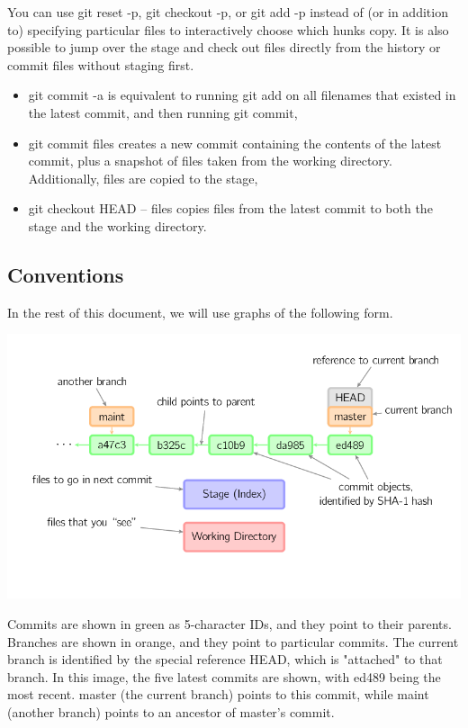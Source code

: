 \documentclass[a4paper]{article}
\begin{document}
\begin{CJK}{UTF8}{mj}
\begin{itemize}
\end{itemize}
You can use git reset -p, git checkout -p, or git add -p instead of (or in addition to) specifying particular files to interactively choose which hunks copy.
It is also possible to jump over the stage and check out files directly from the history or commit files without staging first.

\begin{itemize}
\item git commit -a is equivalent to running git add on all filenames that existed in the latest commit, and then running git commit,
\item git commit files creates a new commit containing the contents of the latest commit, plus a snapshot of files taken from the working directory. Additionally, files are copied to the stage,
\item git checkout HEAD -- files copies files from the latest commit to both the stage and the working directory.
\end{itemize}
\pagebreak

\subsection{Conventions}


In the rest of this document, we will use graphs of the following form.

\begin{center}
\centering
\includegraphics[width=1\textwidth]{conventions.png}
\end{center}
Commits are shown in green as 5-character IDs, and they point to their parents. Branches are shown in orange, and they point to particular commits. The current branch is identified by the special reference HEAD, which is "attached" to that branch. In this image, the five latest commits are shown, with ed489 being the most recent. master (the current branch) points to this commit, while maint (another branch) points to an ancestor of master's commit.


\end{CJK}
\end{document}
